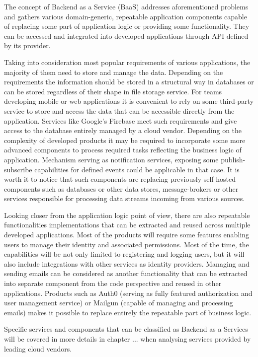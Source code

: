 The concept of Backend as a Service (BaaS) addresses aforementioned problems and gathers various domain-generic, repeatable application components capable of replacing some part of application logic or providing some functionality. They can be accessed and integrated into developed applications through API defined by its provider.

Taking into consideration most popular requirements of various applications, the majority of them need to store and manage the data. Depending on the requirements the information should be stored in a structural way in databases or can be stored regardless of their shape in file storage service. For teams developing mobile or web applications it is convenient to rely on some third-party service to store and access the data that can be accessible directly from the application. Services like Google's Firebase meet such requirements and give access to the database entirely managed by a cloud vendor. Depending on the complexity of developed products it may be required to incorporate some more advanced components to process required tasks reflecting the business logic of application. Mechanism serving as notification services, exposing some publish-subscribe capabilities for defined events could be applicable in that case. It is worth it to notice that such components are replacing previously self-hosted components such as databases or other data stores, message-brokers or other services responsible for processing data streams incoming from various sources.

Looking closer from the application logic point of view, there are also repeatable functionalities implementations that can be extracted and reused across multiple developed applications. Most of the products will require some features enabling users to manage their identity and associated permissions. Most of the time, the capabilities will be not only limited to registering and logging users, but it will also include integrations with other services as identity providers. Managing and sending emails can be considered as another functionality that can be extracted into separate component from the code perspective and reused in other applications. Products such as Auth0 (serving as fully featured authorization and user management service) or Mailgun (capable of managing and processing emails) makes it possible to replace entirely the repeatable part of business logic.

Specific services and components that can be classified as Backend as a Services will be covered in more details in chapter ... when analysing services provided by leading cloud vendors.

